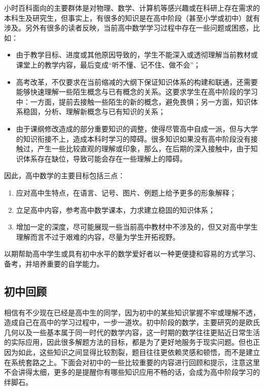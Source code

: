 
\begin{issues}
\issueDraft
\end{issues}

小时百科面向的主要群体是对物理、数学、计算机等感兴趣或在科研上存在需求的本科生及研究生，但事实上，有很多的知识是在高中阶段（甚至小学或初中）就有涉及。另外有很多的读者反映，当前高中数学学习过程中存在一些问题或困惑，比如：
\begin{itemize}
\item 由于教学目标、进度或其他原因导致的，学生不能深入或透彻理解当前教材或课堂上的教学内容，最后变成“听不懂、记不住、做不会”；
\item 高考改革，不仅要求在当前缩减的大纲下保证知识体系的构建和联通，还需要能够快速理解一些陌生概念与已有概念的关系。这要求学生在高中阶段的学习中：一方面，提前去接触一些陌生的新的概念，避免畏惧；另一方面，知识体系稳固，分析、理解新概念与已有知识的关系；
\item 由于课纲修改造成的部分重要知识的调整，使得尽管高中自成一派，但与大学的知识衔接不上，造成本科时学习的障碍。很多知识如果没有高中阶段没有接触过，产生一些比较直观的理解或印象，那么，在后期的深入接触中，由于知识体系存在缺位，导致可能会存在一些理解上的障碍。
\end{itemize}

因此，高中数学的主要目标包括三点：
\begin{enumerate}
\item 应对高中生特点，在语言、记号、图片、例题上给予更多的形象解释；
\item 立足高中内容，参考高中数学课本，力求建立稳固的知识体系；
\item 增加一定的深度，尽可能展现一些当前高中教材中不涉及的，但又对高中学生理解而言不过于艰难的内容，尽量为学生开拓视野。
\end{enumerate}
以期帮助高中学生或具有初中水平的数学爱好者以一种更便捷和容易的方式学习、备考，并培养重要的自学能力。

\subsection{初中回顾}

相信有不少现在已经是高中生的同学，因为初中的某些知识掌握不牢或理解不透，造成自己在高中的学习过程中，一步一道坎。初中阶段的数学，主要研究的是欧氏几何以及一些基本属于同一时代的数学内容，这一时期的数学往往更贴近日常生活的实际应用，因此很多解题方法的目标，都是为了更好地服务于现实问题。但也正因为如此，这些知识之间显得比较割裂，题目往往更依赖灵感和顿悟，而不是建立在系统套路之上。下面会对初中的一些比较重要的内容进行回顾和提示，注意这里不会讲得太细，更多的是提醒你有哪些知识应用不畅的话，会成为高中阶段学习的绊脚石。

